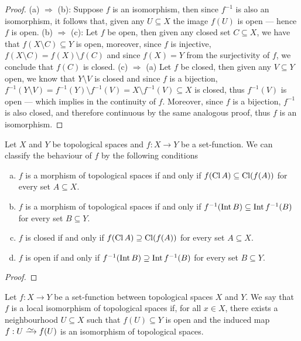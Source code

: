 \begin{proof}
(a) \(\Rightarrow\) (b): Suppose \(f\) is an isomorphism, then since \(f^{-1}\)
is also an isomorphism, it follows that, given any \(U \subseteq X\) the image
\(f(U)\) is open --- hence \(f\) is open. (b) \(\Rightarrow\) (c): Let \(f\) be
open, then given any closed set \(C \subseteq X\), we have that \(f(X \setminus
C) \subseteq Y\) is open, moreover, since \(f\) is injective, \(f(X \setminus C)
= f(X) \setminus f(C)\) and since \(f(X) = Y\) from the surjectivity of \(f\),
we conclude that \(f(C)\) is closed. (c) \(\Rightarrow\) (a) Let \(f\) be
closed, then given any \(V \subseteq Y\) open, we know that \(Y \setminus V\) is
closed and since \(f\) is a bijection, \(f^{-1}(Y \setminus V) = f^{-1}(Y)
\setminus f^{-1}(V) = X \setminus f^{-1}(V) \subseteq X\) is closed, thus
\(f^{-1}(V)\) is open --- which implies in the continuity of \(f\). Moreover,
since \(f\) is a bijection, \(f^{-1}\) is also closed, and therefore continuous
by the same analogous proof, thus \(f\) is an isomorphism.
\end{proof}

\begin{proposition}\label{prop:classification-maps-interior-closure}
Let \(X\) and \(Y\) be topological spaces and \(f: X \to Y\) be a
set-function. We can classify the behaviour of \(f\) by the following conditions
\begin{enumerate}[(a)]\setlength\itemsep{0em}
\item \(f\) is a morphism of topological spaces if and only if \(f(\operatorname{Cl} A)
  \subseteq \operatorname{Cl}(f(A))\) for every set \(A \subseteq X\).
\item \(f\) is a morphism of topological spaces if and only if \(f^{-1}(\operatorname{Int} B)
  \subseteq \operatorname{Int} f^{-1}(B)\) for every set \(B \subseteq Y\).
\item \(f\) is closed if and only if \(f(\operatorname{Cl} A) \supseteq
  \operatorname{Cl}(f(A))\) for every set \(A \subseteq X\).
\item \(f\) is open if and only if \(f^{-1}(\operatorname{Int} B) \supseteq \operatorname{Int} f^{-1}(B)\)
  for every set \(B \subseteq Y\).
\end{enumerate}
\end{proposition}

\begin{proof}
\end{proof}

\begin{definition}
\label{def:local-homeomorphism}
Let \(f: X \to Y\) be a set-function between topological spaces \(X\) and
\(Y\). We say that \(f\) is a local isomorphism of topological spaces if, for
all \(x \in X\), there exists a neighbourhood \(U \subseteq X\) such that \(f(U)
\subseteq Y\) is open and the induced map \(f: U \isoto f(U)\) is an isomorphism
of topological spaces.
\end{definition}


